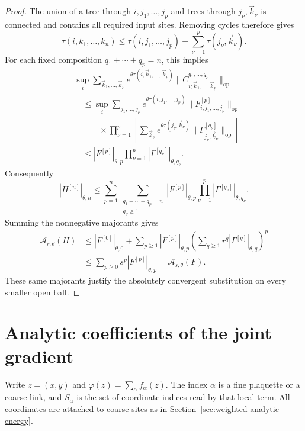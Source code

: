 \documentclass[10pt,reqno]{amsart}
\theoremstyle{definition}
\theoremstyle{remark}
\numberwithin{equation}{section}
\numberwithin{figure}{section}
\begin{document}
\begin{proof}
The union of a tree through $i,j_1,\ldots,j_p$ and trees through
$j_\nu,\vec k_\nu$ is connected and contains all required input
sites. Removing cycles therefore gives
\begin{equation}\label{eq:substitution-tree-inequality}
\tau(i,k_1,\ldots,k_n)
\le\tau(i,j_1,\ldots,j_p)
+\sum_{\nu=1}^p\tau(j_\nu,\vec k_\nu).
\end{equation}
For each fixed composition $q_1+\cdots+q_p=n$, this implies
\begin{equation}\label{eq:substitution-coefficient-product}
\begin{aligned}
&\sup_i\sum_{\vec k_1,\ldots,\vec k_p}
e^{\theta\tau(i,\vec k_1,\ldots,\vec k_p)}
\|C^{q_1,\ldots,q_p}_{i;\vec k_1,\ldots,\vec k_p}\|_{\mathrm{op}}\\
&\quad\le\sup_i\sum_{j_1,\ldots,j_p}
e^{\theta\tau(i,j_1,\ldots,j_p)}
\|F^{[p]}_{i;j_1,\ldots,j_p}\|_{\mathrm{op}}\\
&\qquad\quad\times\prod_{\nu=1}^p
\left[\sum_{\vec k_\nu}
e^{\theta\tau(j_\nu,\vec k_\nu)}
\|\Gamma^{[q_\nu]}_{j_\nu;\vec k_\nu}\|_{\mathrm{op}}\right]\\
&\quad\le |F^{[p]}|_{\theta,p}
\prod_{\nu=1}^p|\Gamma^{[q_\nu]}|_{\theta,q_\nu}.
\end{aligned}
\end{equation}
Consequently
\begin{equation}\label{eq:substitution-degree-convolution}
|H^{[n]}|_{\theta,n}
\le\sum_{p=1}^n\sum_{\substack{q_1+\cdots+q_p=n\\q_\nu\ge1}}
|F^{[p]}|_{\theta,p}\prod_{\nu=1}^p
|\Gamma^{[q_\nu]}|_{\theta,q_\nu}.
\end{equation}
Summing the nonnegative majorants gives
\begin{equation}\label{eq:substitution-series-calculation}
\begin{aligned}
\mathcal A_{r,\theta}(H)
&\le |F^{[0]}|_{\theta,0}
+\sum_{p\ge1}|F^{[p]}|_{\theta,p}
\left(\sum_{q\ge1}r^q|\Gamma^{[q]}|_{\theta,q}\right)^p\\
&\le\sum_{p\ge0}s^p|F^{[p]}|_{\theta,p}
=\mathcal A_{s,\theta}(F).
\end{aligned}
\end{equation}
These same majorants justify the absolutely convergent substitution
on every smaller open ball.
\end{proof}


\section{Analytic coefficients of the joint gradient}\label{sec:local-analytic-gradient}
Write $z=(x,y)$ and $\varphi(z)=\sum_\alpha f_\alpha(z)$.
The index $\alpha$ is a fine plaquette or a coarse link, and
$S_\alpha$ is the set of coordinate indices read by that local term.
All coordinates are attached to coarse sites as in
Section~\ref{sec:weighted-analytic-energy}.
\end{document}
